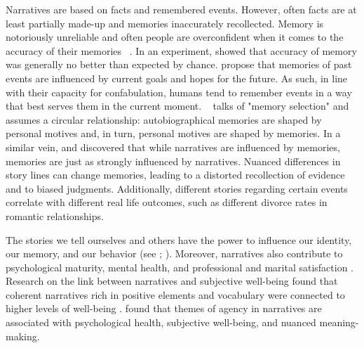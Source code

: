 \documentclass[11pt,a4paper,english,oneside]{book}
\numberwithin{equation}{chapter}
\begin{document}
Narratives are based on facts and remembered events. However, often facts are at least partially made-up and memories inaccurately recollected. Memory is notoriously unreliable and often people are overconfident when it comes to the accuracy of their memories ~\citep{McAdams.2006}. In an experiment, \citet{Offer.2000} showed that accuracy of memory was generally no better than expected by chance. \citet{Conway.2000} propose that memories of past events are influenced by current goals and hopes for the future. As such, in line with their capacity for confabulation, humans tend to remember events in a way that best serves them in the current moment. ~\citet[~p. 300]{McAdams.1982} talks of "memory selection" and assumes a circular relationship: autobiographical memories are shaped by personal motives and, in turn, personal motives are shaped by memories. In a similar vein, \citet{McGregor.1999} and \citet{Murray.1994} discovered that while narratives are influenced by memories, memories are just as strongly influenced by narratives. Nuanced differences in story lines can change memories, leading to a distorted recollection of evidence and to biased judgments. Additionally, different stories regarding certain events correlate with different real life outcomes, such as different divorce rates in romantic relationships. 

The stories we tell ourselves and others have the power to influence our identity, our memory, and our behavior (see \citealp{Pasupathi.1998}; \citealp{Murray.1994}). Moreover, narratives also contribute to psychological maturity, mental health, and professional and marital satisfaction \citep[p. 248]{McAdams.}. Research on the link between narratives and subjective well-being found that coherent narratives rich in positive elements and vocabulary were connected to higher levels of well-being \citep{King.2000}. \cite{Adler.2008} found that themes of agency in narratives are associated with psychological health, subjective well-being, and nuanced meaning-making. 
\end{document}
